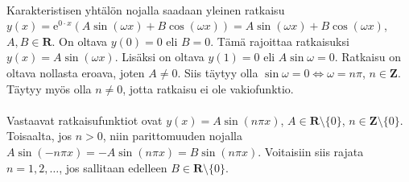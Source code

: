\documentclass[12pt,fleqn]{article}
\begin{document}
\begin{enumerate}[label=\textbf{\arabic*.}]
 \\
Karakteristisen yhtälön nojalla saadaan yleinen ratkaisu \(y(x)=\text{e}^{0\cdot x} (A\sin (\omega x)+B\cos (\omega x))=A\sin (\omega x)+B\cos (\omega x)\), \(A, B\in \mathbf{R}\). On oltava \(y(0)=0\) eli \(B=0\). Tämä rajoittaa ratkaisuksi \(y(x)=A\sin (\omega x)\). Lisäksi on oltava \(y(1)=0\) eli \(A\sin \omega = 0\). Ratkaisu on oltava nollasta eroava, joten \(A\neq 0\). Siis täytyy olla \(\sin \omega =0 \iff \omega =n\pi\), \(n\in \mathbf{Z}\). Täytyy myös olla \(n\neq 0\), jotta ratkaisu ei ole vakiofunktio.\\
 \\
Vastaavat ratkaisufunktiot ovat \(y(x)=A\sin (n\pi x)\), \(A\in \mathbf{R} \setminus \{0\}\), \(n\in \mathbf{Z} \setminus \{0\}\).\\
Toisaalta, jos \(n>0\), niin parittomuuden nojalla \(A\sin (-n\pi x)=-A\sin (n\pi x)=B\sin (n\pi x)\). Voitaisiin siis rajata \(n=1, 2, \ldots\), jos sallitaan edelleen \(B\in \mathbf{R}\setminus \{0\}\).
\end{enumerate}

\newpage
\end{document}
